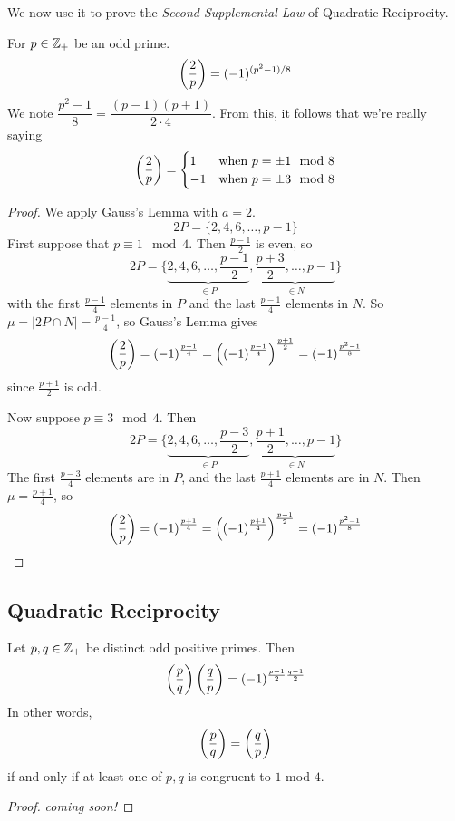 We now use it to prove the \emph{Second Supplemental Law} of Quadratic Reciprocity.
\begin{proposition}
    For $p\in\mathbb Z_+$ be an odd prime.
    \[\left(\dfrac{2}{p}\right) = (-1)^{(p^2 - 1)/8}\]
    We note $\dfrac{p^2-1}{8} = \dfrac{(p-1)(p+1)}{2\cdot 4}$. From this, it follows that we're really saying
    \[\left(\dfrac{2}{p}\right) = \begin{cases}
            1  & \text{when $p = \pm 1\mod 8$} \\
            -1 & \text{when $p = \pm 3\mod 8$}
        \end{cases}\]
\end{proposition}
\begin{proof}
    We apply Gauss's Lemma with $a = 2$.
    \[2P = \{2, 4, 6, \dots, p-1\}\]
    First suppose that $p\equiv 1\mod 4$. Then $\frac{p-1}{2}$ is even, so
    \[2P = \bigg\{\underbrace{2, 4, 6, \dots, \frac{p-1}{2}}_{\in P}, \underbrace{\frac{p+3}{2}, \dots, p-1}_{\in N}\bigg\}\]
    with the first $\frac{p-1}{4}$ elements in $P$ and the last $\frac{p-1}{4}$ elements in $N$. So $\mu = |2P\cap N| = \frac{p-1}{4}$, so Gauss's Lemma gives
    \[\left(\dfrac{2}{p}\right)
        = (-1)^{\frac{p-1}{4}}
        = \left((-1)^{\frac{p-1}{4}}\right)^{\frac{p+1}{2}}
        = (-1)^{\frac{p^2-1}{8}}\]
    since $\frac{p+1}{2}$ is odd.

    Now suppose $p\equiv 3\mod 4$. Then
    \[2P = \bigg\{\underbrace{2, 4, 6, \dots, \frac{p-3}{2}}_{\in P}, \underbrace{\frac{p+1}{2}, \dots, p-1}_{\in N}\bigg\}\]
    The first $\frac{p-3}{4}$ elements are in $P$, and the last $\frac{p+1}{4}$ elements are in $N$. Then $\mu = \frac{p+1}{4}$, so
    \[\left(\dfrac{2}{p}\right)
        = (-1)^{\frac{p+1}{4}}
        = \left((-1)^{\frac{p+1}{4}}\right)^{\frac{p-1}{2}}
        = (-1)^{\frac{p^2-1}{8}}\]
\end{proof}

\subsection{Quadratic Reciprocity}
\begin{theorem}\label{thm:qr}
    Let $p, q\in\mathbb Z_+$ be distinct odd positive primes. Then
    \begin{equation*}
        \left(\dfrac{p}{q}\right)\left(\dfrac{q}{p}\right) = (-1)^{\frac{p-1}{2}\frac{q-1}{2}}
    \end{equation*}
    In other words,
    \[\left(\dfrac{p}{q}\right) = \left(\dfrac{q}{p}\right)\]
    if and only if at least one of $p, q$ is congruent to $1$ mod $4$.
\end{theorem}
\begin{proof}
    \emph{coming soon!}
\end{proof}

